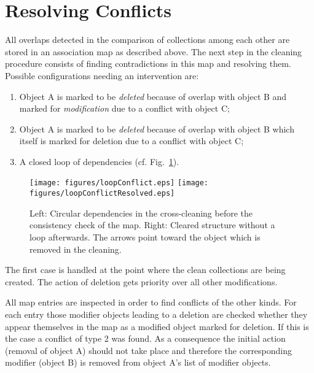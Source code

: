 \documentclass{cmspaper}
\begin{document}
\section{Resolving Conflicts}
\label{mapReso}
All overlaps detected in the comparison of collections among each other are
stored in an association map as described above. The next step in the
cleaning procedure consists of finding contradictions in this map and resolving
them. Possible configurations
needing an intervention are:
\begin{enumerate}
    \item Object A is marked to be \textit{deleted} because of overlap with
	object B and marked for \textit{modification} due to a conflict with
	object C;
    \item Object A is marked to be \textit{deleted} because of overlap with
	object B which itself is marked for deletion due to a conflict with
	object C;
    \item A closed loop of dependencies (cf. Fig.~\ref{fig:loopReso}).
\end{enumerate}

\begin{figure}[hb]
\begin{center}
    \texttt{[image: figures/loopConflict.eps]}
    \hspace*{1.5cm}
    \texttt{[image: figures/loopConflictResolved.eps]}
    \caption{Left: Circular dependencies in the cross-cleaning before the
    consistency check of the map. Right: Cleared structure without a loop
    afterwards. The arrows point toward the object which is removed in the
    cleaning.}
    \label{fig:loopReso}
\end{center}
\end{figure}

The first case is handled at the point where the clean collections are
being created. The action of deletion gets priority over all other
modifications.

All map entries are inspected in order to find conflicts of the other kinds.
For each entry those modifier objects leading to a deletion are checked whether
they appear themselves in the map as a modified object marked for deletion. If
this is the case a conflict of type 2 was found. As a consequence the
initial action (removal of object A) should not take place and therefore the
corresponding modifier (object B) is removed from object A's list of modifier
objects.
\end{document}
